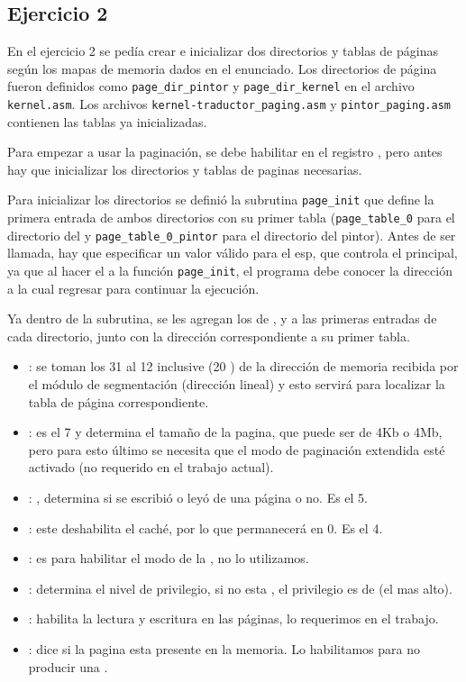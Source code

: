 \subsection{Ejercicio 2}
	En el ejercicio 2 se pedía crear e inicializar dos directorios y tablas de páginas según los mapas de memoria dados en el enunciado. Los 
directorios de página fueron definidos como \verb=page_dir_pintor= y \verb=page_dir_kernel= en el archivo \verb=kernel.asm=. Los archivos 
\verb=kernel-traductor_paging.asm= y \verb=pintor_paging.asm= contienen las tablas ya inicializadas. 

	Para empezar a usar la paginación, se debe habilitar en el registro , pero antes hay que inicializar los directorios y tablas de paginas 
necesarias. 

	Para inicializar los directorios se definió la subrutina \verb=page_init= que define la primera entrada de ambos directorios con su primer tabla 
(\verb=page_table_0= para el directorio del  y \verb=page_table_0_pintor= para el directorio del pintor). Antes de ser llamada, hay que 
especificar un valor válido para el esp, que controla el  principal, ya que al hacer el  a la función \verb=page_init=, el 
programa debe conocer la dirección a la cual regresar para continuar la ejecución. 

Ya dentro de la subrutina, se les agregan los  de ,  y  a las primeras entradas de cada 
directorio, junto con la dirección correspondiente a su primer tabla. 

\begin{itemize}
	\item{}: se toman los  31 al 12 inclusive (20 ) de la dirección de memoria recibida por el módulo 
de segmentación (dirección lineal) y esto servirá para localizar la tabla de página correspondiente.
	\item{}: es el  7 y determina el tamaño de la pagina, que puede ser de 4Kb o 4Mb, pero para esto último se necesita que 
el modo  de paginación extendida esté activado (no requerido en el trabajo actual).
	\item{}: , determina si se escribió o leyó de una página o no. Es el  5.
	\item{}: este  deshabilita el caché, por lo que permanecerá en 0. Es el  4.
	\item{}: es para habilitar el modo  de la , no lo utilizamos.
	\item{}: determina el nivel de privilegio, si no esta , el privilegio es de  (el mas alto). 
	\item{}: habilita la lectura y escritura en las páginas, lo requerimos en el trabajo.
	\item{}: dice si la pagina esta presente en la memoria. Lo habilitamos para no producir una .
\end{itemize}
	
